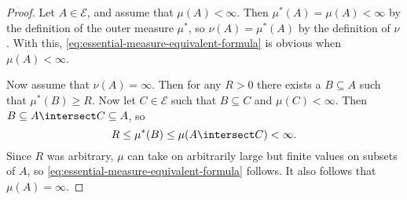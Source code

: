 \documentclass[article, a4paper, 11pt, oneside]{memoir}
\numberwithin{equation}{chapter}
\newcommand{\calE}{\mathcal{E}}
\begin{document}
\begin{proof}
    Let $A \in \calE$, and assume that $\mu(A) < \infty$. Then $\mu^*(A) = \mu(A) < \infty$ by the definition of the outer measure $\mu^*$, so $\nu(A) = \mu^*(A)$ by the definition of $\nu$. With this, \eqref{eq:essential-measure-equivalent-formula} is obvious when $\mu(A) < \infty$.

    Now assume that $\nu(A) = \infty$. Then for any $R > 0$ there exists a $B \subseteq A$ such that $\mu^*(B) \geq R$. Now let $C \in \calE$ such that $B \subseteq C$ and $\mu(C) < \infty$. Then $B \subseteq A \intersect C \subseteq A$, so
    \begin{equation*}
        R
            \leq \mu^*(B)
            \leq \mu(A \intersect C)
            < \infty.
    \end{equation*}
    Since $R$ was arbitrary, $\mu$ can take on arbitrarily large but finite values on subsets of $A$, so \eqref{eq:essential-measure-equivalent-formula} follows. It also follows that $\mu(A) = \infty$.


\end{proof}
\end{document}
